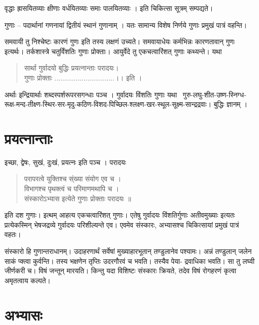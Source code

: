 वृद्धाः ह्रासयितव्याः क्षीणाः वर्धयितव्याः समाः पालयितव्याः । इति चिकित्सा सूत्रम् सम्पद्यते।

गुणाः – पदार्थानां गणनायां द्वितीयं स्थानं गुणानाम् । यतः सामान्य विशेष निर्णये गुणाः प्रमुखं पात्रं वहन्ति।


समवायी तु निश्चेष्टः कारणं गुणः इति तस्य लक्षणं उच्यते। समवायाधेयः कर्मभिन्नः कारणतावान् गुणः इत्यर्थः। तर्कशास्त्रे चतुर्विंशतिः गुणाः प्रोक्ताः। आयुर्वेदे तु एकचत्वारिंशत् गुणाः कथ्यन्ते। यथा

\begin{verse}
सार्था गुर्वादयो बुद्धिः प्रयत्नान्ताः परादयः।\\
गुणाः प्रोक्ताः ...............................।। इति ।
\end{verse}
अर्थाः इन्द्रियार्थाः शब्दस्पर्शरूपरसगन्धाः पञ्च । गुर्वादयः विंशतिः गुणाः यथा \ गुरु-लघु-शीत-उष्ण-स्निग्ध- रूक्ष-मन्द-तीक्ष्ण-स्थिर-सर-मृदु-कठिण-विशद-पिच्छिल-श्लक्ष्ण-खर-स्थूल-सूक्ष्म-सान्द्रद्रवाः। बुद्धिः ज्ञानम् ।

\section*{प्रयत्नान्ताः}

इच्छा, द्वेषः, सुखं, दुःखं, प्रयत्नः इति पञ्च । परादयः

\begin{verse}
परापरत्वे युक्तिश्च स्ंख्या संयोग एव च ।\\
विभागश्च पृथक्त्वं च परिमाणमथापि च ।\\
संस्कारोऽभ्यास इत्येते गुणाः प्रोक्ताः परादयः ॥
\end{verse}
इति दश गुणाः। इत्थम् आहत्य एकचत्वारिंशत् गुणाः। एतेषु गुर्वादयः विंशतिर्गुणाः अतीवमुख्याः इत्यतः प्रत्येकस्मिन् भेषजद्रव्ये गुर्वादयः परिशील्यन्ते एव। एवमेव संस्कारः, अभ्यासश्च चिकित्सायां प्रमुखं पात्रं वहतः।

संस्कारो हि गुणान्तराधानम्। उदाहरणार्थं सर्वेषां मुख्याहारभूतान् तण्डुलानेव पश्यामः। अन्नं तण्डुलान् जलेन साकं प्क्त्वा कुर्वन्ति। तस्य भक्षणेन तृप्तिः उदरगौरवं च भवति। तस्यैव पेया-  द्रवाधिका भवति। सा तु लघ्वी जीर्णकरी च। विषं जन्तून् मारयति। किन्तु यदा विशिष्टः संस्कारः क्रियते, तदेव विषं रोगहरणं कृत्वा अमृतत्वाय कल्पते।

\section*{अभ्यासः}

